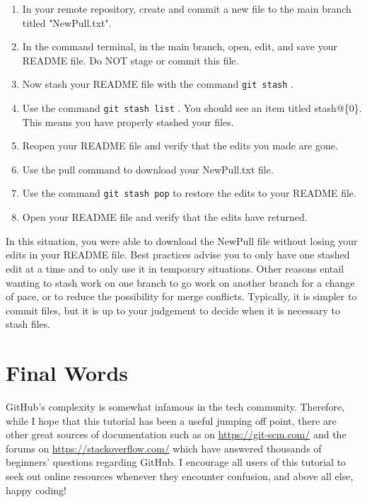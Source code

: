 \documentclass[10pt]{article}
\begin{document}
\begin{enumerate}
\item In your remote repository, create and commit a new file to the main branch titled "NewPull.txt".
\item In the command terminal, in the main branch, open, edit, and save your README file. Do NOT stage or commit this file.
\item Now stash your README file with the command \texttt{git stash} .
\item Use the command \texttt{git stash list} . You should see an item titled stash@\{0\}. This means you have properly stashed your files. 
\item Reopen your README file and verify that the edits you made are gone.
\item Use the pull command to download your NewPull.txt file.
\item Use the command \texttt{git stash pop} to restore the edits to your README file. 
\item Open your README file and verify that the edits have returned.
\end{enumerate}

In this situation, you were able to download the NewPull file without losing your edits in your README file. Best practices advise you to only have one stashed edit at a time and to only use it in temporary situations. Other reasons entail wanting to stash work on one branch to go work on another branch for a change of pace, or to reduce the possibility for merge conflicts. Typically, it is simpler to commit files, but it is up to your judgement to decide when it is necessary to stash files.

\section{Final Words}

GitHub's complexity is somewhat infamous in the tech community. Therefore, while I hope that this tutorial has been a useful jumping off point, there are other great sources of documentation such as on \url{https://git-scm.com/} and the forums on \url{https://stackoverflow.com/} which have answered thousands of beginners' questions regarding GitHub. I encourage all users of this tutorial to seek out online resources whenever they encounter confusion, and above all else, happy coding!
\end{document}
